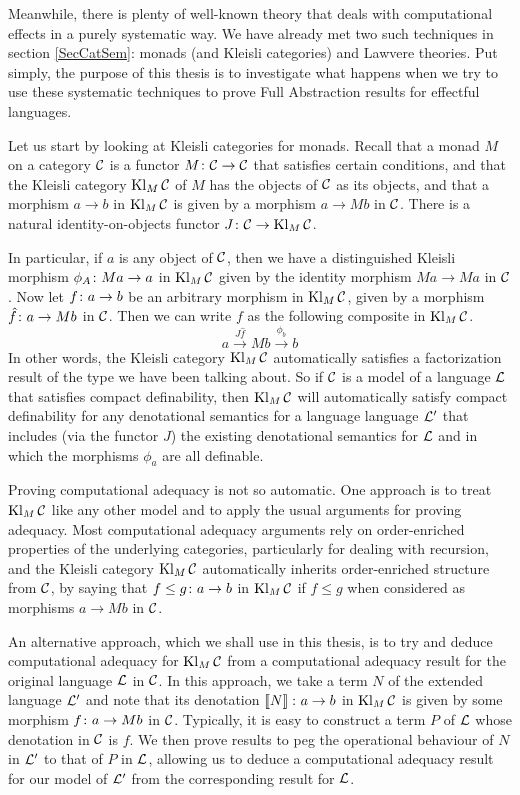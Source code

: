 Meanwhile, there is plenty of well-known theory that deals with computational effects in a purely systematic way.  
We have already met two such techniques in section \ref{SecCatSem}: monads (and Kleisli categories) and Lawvere theories.
Put simply, the purpose of this thesis is to investigate what happens when we try to use these systematic techniques to prove Full Abstraction results for effectful languages.

Let us start by looking at Kleisli categories for monads.  
Recall that a monad $M$ on a category ${\mathcal{C}}$ is a functor $M \colon {\mathcal{C}} \to {\mathcal{C}}$ that satisfies certain conditions, and that the Kleisli category $\operatorname{Kl}_M{\mathcal{C}}$ of $M$ has the objects of ${\mathcal{C}}$ as its objects, and that a morphism $a \to b$ in $\operatorname{Kl}_M{\mathcal{C}}$ is given by a morphism $a \to Mb$ in ${\mathcal{C}}$.
There is a natural identity-on-objects functor $J\colon {\mathcal{C}} \to \operatorname{Kl}_M{\mathcal{C}}$.

In particular, if $a$ is any object of ${\mathcal{C}}$, then we have a distinguished Kleisli morphism $\phi_A\colon Ma \to a$ in $\operatorname{Kl}_M{\mathcal{C}}$ given by the identity morphism $Ma \to Ma$ in ${\mathcal{C}}$.
Now let $f\colon a \to b$ be an arbitrary morphism in $\operatorname{Kl}_M{\mathcal{C}}$, given by a morphism $\hat f\colon a \to Mb$ in ${\mathcal{C}}$.
Then we can write $f$ as the following composite in $\operatorname{Kl}_M{\mathcal{C}}$.
\[
  a \xrightarrow{J\hat{f}} Mb \xrightarrow{\phi_b} b
  \]
In other words, the Kleisli category $\operatorname{Kl}_M{\mathcal{C}}$ automatically satisfies a factorization result of the type we have been talking about.  
So if ${\mathcal{C}}$ is a model of a language $\mathcal L$ that satisfies compact definability, then $\operatorname{Kl}_M{\mathcal{C}}$ will automatically satisfy compact definability for any denotational semantics for a language language $\mathcal L'$ that includes (via the functor $J$) the existing denotational semantics for $\mathcal L$ and in which the morphisms $\phi_a$ are all definable.

Proving computational adequacy is not so automatic.  
One approach is to treat $\operatorname{Kl}_M{\mathcal{C}}$ like any other model and to apply the usual arguments for proving adequacy.  
Most computational adequacy arguments rely on order-enriched properties of the underlying categories, particularly for dealing with recursion, and the Kleisli category $\operatorname{Kl}_M{\mathcal{C}}$ automatically inherits order-enriched structure from ${\mathcal{C}}$, by saying that $f\le g\colon a \to b$ in $\operatorname{Kl}_M{\mathcal{C}}$ if $f\le g$ when considered as morphisms $a \to Mb$ in ${\mathcal{C}}$.

An alternative approach, which we shall use in this thesis, is to try and deduce computational adequacy for $\operatorname{Kl}_M{\mathcal{C}}$ from a computational adequacy result for the original language $\mathcal L$ in ${\mathcal{C}}$.  
In this approach, we take a term $N$ of the extended language $\mathcal L'$ and note that its denotation $\left\llbracket N\right\rrbracket \colon a \to b$ in $\operatorname{Kl}_M{\mathcal{C}}$ is given by some morphism $f \colon a \to Mb$ in ${\mathcal{C}}$.  
Typically, it is easy to construct a term $P$ of $\mathcal L$ whose denotation in ${\mathcal{C}}$ is $f$.
We then prove results to peg the operational behaviour of $N$ in $\mathcal L'$ to that of $P$ in $\mathcal L$, allowing us to deduce a computational adequacy result for our model of $\mathcal L'$ from the corresponding result for $\mathcal L$.

